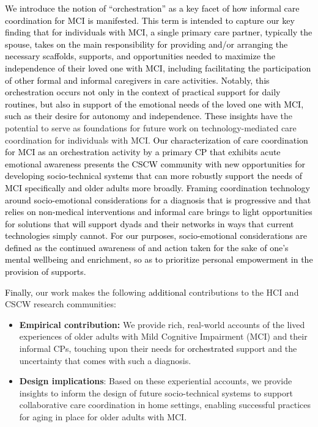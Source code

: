 \documentclass[acmsmall]{acmart}
\begin{document}
\textcolor{black}{We introduce the notion of “orchestration” as a key facet of how informal care coordination for MCI is manifested. This term is intended to capture our key finding that for individuals with MCI, a single primary care partner, typically the spouse, takes on the main responsibility for providing and/or arranging the necessary scaffolds, supports, and opportunities needed to maximize the independence of their loved one with MCI, including facilitating the participation of other \textcolor{black}{formal} and informal caregivers in care activities. Notably, this orchestration occurs not only in the context of practical support for daily routines, but also in support of the emotional needs of the loved one with MCI, such as their desire for autonomy and independence.} \textcolor{black}{These insights have} the potential to serve as foundations for future work on technology-mediated care coordination for individuals with MCI. \textcolor{black}{Our characterization of care coordination for MCI as an orchestration activity by a primary CP that \textcolor{black}{exhibits} acute emotional awareness presents the  CSCW community with new opportunities for developing socio-technical systems that can more robustly support the needs of MCI specifically and older adults more broadly. Framing coordination technology around socio-emotional considerations for a diagnosis that is progressive and that relies on non-medical interventions and informal care \textcolor{black}{brings to light opportunities for solutions that} will support dyads and their networks in ways that current technologies simply cannot. \textcolor{black}{For our purposes, socio-emotional considerations are defined as the continued awareness of and action taken for the sake of one’s mental wellbeing and enrichment, so as to prioritize personal empowerment in the provision of supports.}}


\textcolor{black}{Finally,} our work makes the following \textcolor{black}{additional} contributions to the HCI and CSCW research communities:

\begin{itemize}
    \item \textbf{Empirical contribution:} We provide rich, real-world accounts of the lived experiences of older adults with Mild Cognitive Impairment (MCI) and their informal CPs, touching upon their needs for \textcolor{black}{orchestrated} support and the uncertainty that comes with such a diagnosis.
    \item \textbf{Design implications}: Based on these experiential accounts, we provide insights to inform the design of future socio-technical systems to support collaborative care coordination in home settings, enabling successful practices for aging in place for older adults with MCI.
\end{itemize}
\end{document}
